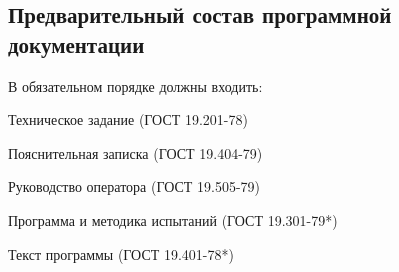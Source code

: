 \subsection{Предварительный состав программной документации}
В обязательном порядке должны входить:
\begin{my_enumerate}
\item Техническое задание  (ГОСТ 19.201-78)
\item Пояснительная записка  (ГОСТ 19.404-79)
\item Руководство оператора  (ГОСТ 19.505-79)
\item Программа и методика испытаний (ГОСТ 19.301-79*)
\item Текст программы  (ГОСТ 19.401-78*)
\end{my_enumerate}

